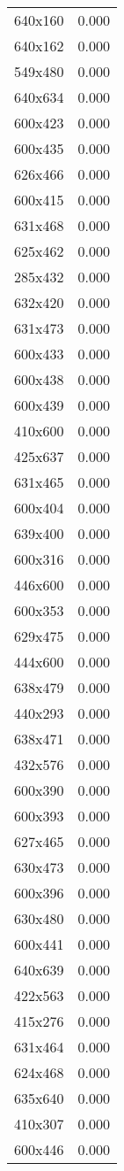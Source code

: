 \begin{table}
\begin{tabular}{lr}
640x160 & 0.000 \\
640x162 & 0.000 \\
549x480 & 0.000 \\
640x634 & 0.000 \\
600x423 & 0.000 \\
600x435 & 0.000 \\
626x466 & 0.000 \\
600x415 & 0.000 \\
631x468 & 0.000 \\
625x462 & 0.000 \\
285x432 & 0.000 \\
632x420 & 0.000 \\
631x473 & 0.000 \\
600x433 & 0.000 \\
600x438 & 0.000 \\
600x439 & 0.000 \\
410x600 & 0.000 \\
425x637 & 0.000 \\
631x465 & 0.000 \\
600x404 & 0.000 \\
639x400 & 0.000 \\
600x316 & 0.000 \\
446x600 & 0.000 \\
600x353 & 0.000 \\
629x475 & 0.000 \\
444x600 & 0.000 \\
638x479 & 0.000 \\
440x293 & 0.000 \\
638x471 & 0.000 \\
432x576 & 0.000 \\
600x390 & 0.000 \\
600x393 & 0.000 \\
627x465 & 0.000 \\
630x473 & 0.000 \\
600x396 & 0.000 \\
630x480 & 0.000 \\
600x441 & 0.000 \\
640x639 & 0.000 \\
422x563 & 0.000 \\
415x276 & 0.000 \\
631x464 & 0.000 \\
624x468 & 0.000 \\
635x640 & 0.000 \\
410x307 & 0.000 \\
600x446 & 0.000 \\

\end{tabular}
\end{table}
